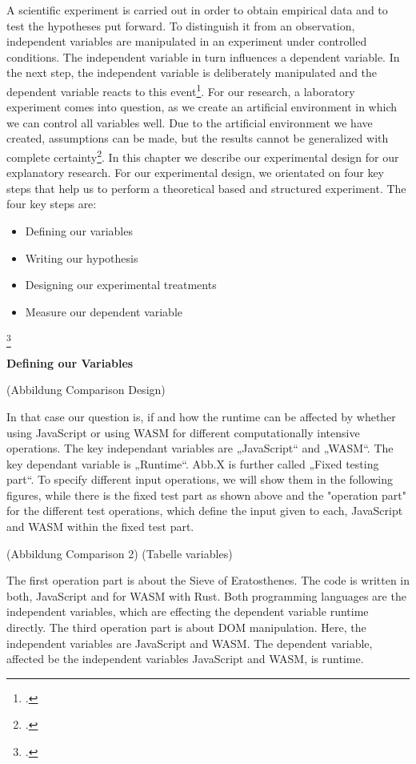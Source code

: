 A scientific experiment is carried out in order to obtain empirical data and to test the hypotheses put forward. To distinguish it from an observation, independent variables are manipulated in an experiment under controlled conditions. The independent variable in turn influences a dependent variable. In the next step, the independent variable is deliberately manipulated and the dependent variable reacts to this event\footcite{genau_experiment_2018}.
For our research, a laboratory experiment comes into question, as we create an artificial environment in which we can control all variables well. Due to the artificial environment we have created, assumptions can be made, but the results cannot be generalized with complete certainty\footcite{genau_experiment_2018}.
In this chapter we describe our experimental design for our explanatory research. 
For our experimental design, we orientated on four key steps that help us to perform a theoretical based and structured experiment. The four key steps are:\newline
\begin{itemize}
    \item Defining our variables
    \item Writing our hypothesis
    \item Designing our experimental treatments
    \item Measure our dependent variable
\end{itemize}
\footcite{bevans_guide_2019}

\textbf{Defining our Variables} \newline

(Abbildung Comparison Design)

In that case our question is, if and how the runtime can be affected by whether using JavaScript or using WASM for different computationally intensive operations. The key independant variables are „JavaScript“ and „WASM“. The key dependant variable is „Runtime“. Abb.X is further called „Fixed testing part“.
To specify different input operations, we will show them in the following figures, while there is the fixed test part as shown above and the "operation part" for the different test operations, which define the input given to each, JavaScript and WASM within the fixed test part.

(Abbildung Comparison 2)
(Tabelle variables)

The first operation part is about the Sieve of Eratosthenes. The code is written in both, JavaScript and for WASM with Rust. Both programming languages are the independent variables, which are effecting the dependent variable runtime directly.
The third operation part is about DOM manipulation. Here, the independent variables are JavaScript and WASM. The dependent variable, affected be the independent variables JavaScript and WASM, is runtime.


